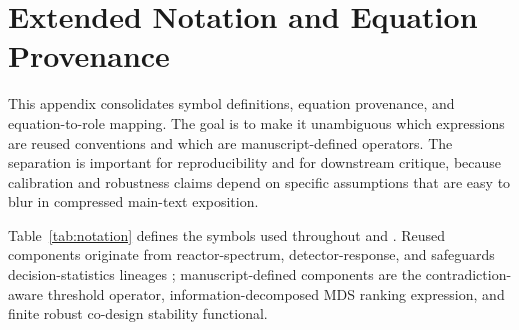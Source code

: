 \documentclass{article} %
\begin{document}
\clearpage{}\label{sec:end_of_main}







\appendix
\clearpage{}\label{sec:appendix_start}

\section{Extended Notation and Equation Provenance}\label{sec:appendix_notation}
This appendix consolidates symbol definitions, equation provenance, and equation-to-role mapping. The goal is to make it unambiguous which expressions are reused conventions and which are manuscript-defined operators. The separation is important for reproducibility and for downstream critique, because calibration and robustness claims depend on specific assumptions that are easy to blur in compressed main-text exposition.

Table~\ref{tab:notation} defines the symbols used throughout  and . Reused components originate from reactor-spectrum, detector-response, and safeguards decision-statistics lineages \citep{SRC014,SRC030,SRC023,SRC009,SRC017}; manuscript-defined components are the contradiction-aware threshold operator, information-decomposed MDS ranking expression, and finite robust co-design stability functional.
\end{document}
